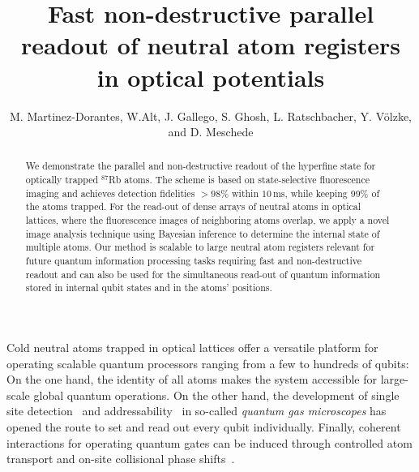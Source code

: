 \documentclass[aps,prl,twocolumn,english,showpacs]{revtex4-1}
\begin{document}
\title{Fast non-destructive parallel readout of neutral atom registers in optical potentials}

\author{M. Martinez-Dorantes, W.Alt, J. Gallego, S. Ghosh, L. Ratschbacher, Y. V\"olzke, and D. Meschede}

\begin{abstract}
We demonstrate the parallel and non-destructive readout of the hyperfine state for optically trapped $^{87}$Rb atoms. The scheme is based on state-selective fluorescence imaging and achieves detection fidelities $>98$\% within $10\,$ms, while keeping 99\% of the atoms trapped. For the read-out of dense arrays of neutral atoms in optical lattices, where the fluorescence images of neighboring atoms overlap, we apply a novel image analysis technique using Bayesian inference to determine the internal state of multiple atoms. Our method is scalable to large neutral atom registers relevant for future quantum information processing tasks requiring fast and non-destructive readout and can also be used for the simultaneous read-out of quantum information stored in internal qubit states and in the atoms' positions.
\end{abstract}


\maketitle
Cold neutral atoms trapped in optical lattices offer a versatile platform for operating scalable quantum processors ranging from a few to hundreds of qubits: On the one hand, the identity of all atoms makes the system accessible for large-scale global quantum operations. On the other hand, the development of single site detection~\cite{bakr2009,sherson2010} and addressability~\cite{weitenberg2011single} in so-called \emph{quantum gas microscopes} has opened the route to set and read out every qubit individually. Finally, coherent interactions for operating quantum gates can be induced through controlled atom transport and on-site collisional phase shifts~\cite{mandel2003,anderlini2007controlled}.
\end{document}
